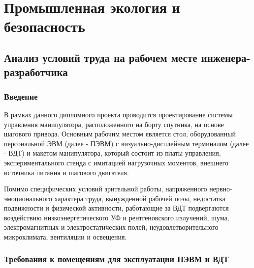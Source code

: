 \newpage
\section{Промышленная экология и безопасность}

\subsection{Анализ условий труда на рабочем месте инженера-разработчика}

\subsubsection{Введение}

В рамках данного дипломного проекта проводится проектирование системы управления
манипулятора, расположенного на борту спутника, на основе шагового привода.
Основным рабочим местом является стол, оборудованный персональной ЭВМ
(далее - ПЭВМ) с визуально-дисплейным терминалом (далее - ВДТ) и макетом
манипулятора, который состоит из платы управления, экспериментального стенда с
имитацией нагрузочных моментов, внешнего источника питания и шагового двигателя.


Помимо специфических условий зрительной работы, напряженного
нервно-эмоционального характера труда, вынужденной рабочей позы, недостатка
подвижности и физической активности, работающие за ВДТ подвергаются воздействию
низкоэнергетического УФ и рентгеновского излучений, шума, электромагнитных и
электростатических полей, неудовлетворительного микроклимата, вентиляции и
освещения.

\subsubsection{Требования к помещениям для эксплуатации ПЭВМ и ВДТ}
